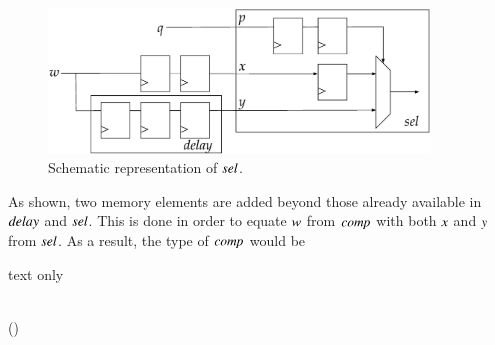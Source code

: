 \begin{figure}[H]
\begin{center}
\centering
\includegraphics[width=0.9\textwidth]{images/compseldelay}
\end{center}
\caption{Schematic representation of \ensuremath{\Varid{sel}}.} \label{fig:compseldelay}
\end{figure}

As shown, two memory elements are added beyond those already available in \ensuremath{\Varid{delay}} and \ensuremath{\Varid{sel}}. 
This is done in order to equate \ensuremath{\Varid{w}} from \ensuremath{\Varid{comp}} with both \ensuremath{\Varid{x}} and \ensuremath{\Varid{y}} from \ensuremath{\Varid{sel}}.
As a result, the type of \ensuremath{\Varid{comp}} would be 
\begin{changemargin}{1cm}{0cm}
\begin{expansionno}{text only}\begin{hscode}\SaveRestoreHook
{}%
%
%
\>[3]{}\mathbin{::}\langle{}\rangle\to {}\langle{}\mathbin{+}\rangle\to {}\langle{}\mathbin{+}\rangle{}\<[E]%
\\
\>[3]{}\;\;\mathrel{=}\;\;\;(\;){}\<[E]%
\ColumnHook
\end{hscode}\resethooks
\end{expansionno}
\end{changemargin}

